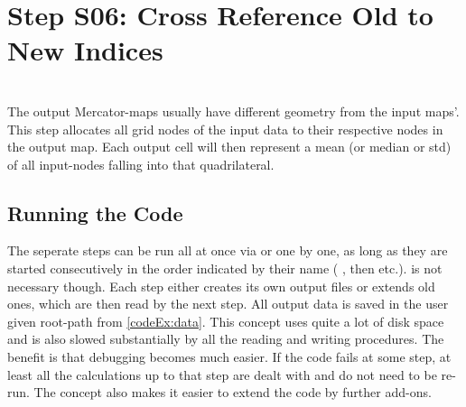 \section{Step S06: Cross Reference Old to New Indices} \label{S:06}
\\
The output Mercator-maps usually have different geometry from the input maps'.
This step allocates all grid nodes of the input data
to their respective nodes in the output map. Each output cell will then represent a mean (or median or std) of all input-nodes falling into that quadrilateral.



\subsection{Running the Code}
The seperate steps can be run all at once via  or one by one, as
long as they are started consecutively in the order indicated by their name
( , then  etc.).  is not necessary
though. Each step either creates its own output files or extends old ones,  which are then read by the next step.
All output data is saved in the user given root-path from \cref{codeEx:data}.
This concept uses quite a lot of disk space and is also slowed substantially by all the reading and writing procedures. The benefit is that debugging becomes much easier. If the code fails at some step,
at least all the calculations up to that step are dealt with and do not need to
be re-run. The concept also makes it easier to extend the code by further
add-ons.











